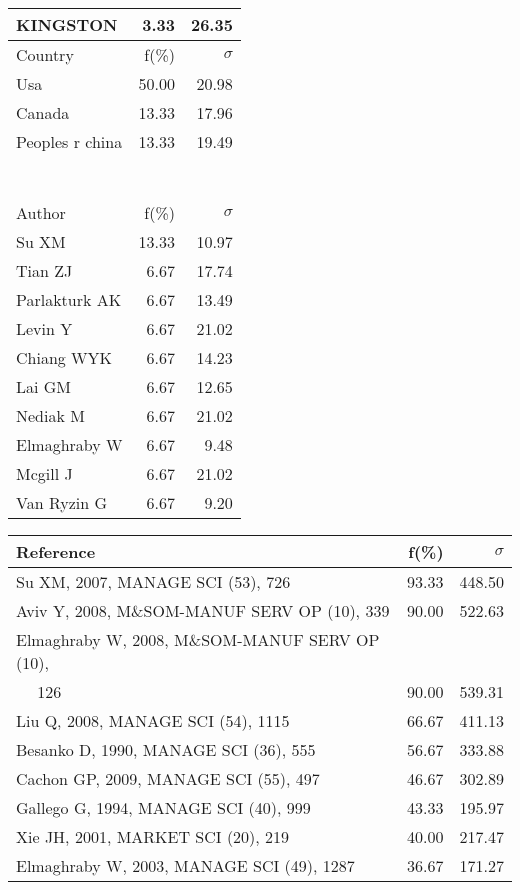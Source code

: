 \documentclass[a4paper,11pt]{report}
\begin{document}
\begin{landscape}
\begin{table}[!ht]
{\begin{tabular}{|l r r|}
KINGSTON & 3.33 & 26.35\\
\hline
\hline
Country & f(\%) & $\sigma$\\
\hline
Usa & 50.00 & 20.98\\
Canada & 13.33 & 17.96\\
Peoples r china & 13.33 & 19.49\\
 &  & \\
 &  & \\
 &  & \\
 &  & \\
 &  & \\
 &  & \\
 &  & \\
\hline
\hline
Author & f(\%) & $\sigma$\\
\hline
Su XM & 13.33 & 10.97\\
Tian ZJ & 6.67 & 17.74\\
Parlakturk AK & 6.67 & 13.49\\
Levin Y & 6.67 & 21.02\\
Chiang WYK & 6.67 & 14.23\\
Lai GM & 6.67 & 12.65\\
Nediak M & 6.67 & 21.02\\
Elmaghraby W & 6.67 & 9.48\\
Mcgill J & 6.67 & 21.02\\
Van Ryzin G & 6.67 & 9.20\\
\hline
\end{tabular}
}
{\scriptsize\begin{tabular}{|l r r|}
\hline
Reference & f(\%) & $\sigma$\\
\hline
Su XM, 2007, MANAGE SCI (53), 726 & 93.33 & 448.50\\
Aviv Y, 2008, M\&SOM-MANUF SERV OP (10), 339 & 90.00 & 522.63\\
Elmaghraby W, 2008, M\&SOM-MANUF SERV OP (10), &  & \\
$\quad$ 126 & 90.00 & 539.31\\
Liu Q, 2008, MANAGE SCI (54), 1115 & 66.67 & 411.13\\
Besanko D, 1990, MANAGE SCI (36), 555 & 56.67 & 333.88\\
Cachon GP, 2009, MANAGE SCI (55), 497 & 46.67 & 302.89\\
Gallego G, 1994, MANAGE SCI (40), 999 & 43.33 & 195.97\\
Xie JH, 2001, MARKET SCI (20), 219 & 40.00 & 217.47\\
Elmaghraby W, 2003, MANAGE SCI (49), 1287 & 36.67 & 171.27\\

\end{tabular}}
\end{table}
\end{landscape}
\end{document}

